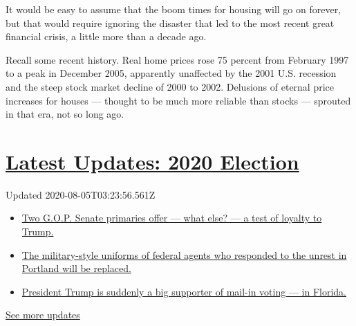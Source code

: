 It would be easy to assume that the boom times for housing will go on
forever, but that would require ignoring the disaster that led to the
most recent great financial crisis, a little more than a decade ago.

Recall some recent history. Real home prices rose 75 percent from
February 1997 to a peak in December 2005, apparently unaffected by the
2001 U.S. recession and the steep stock market decline of 2000 to 2002.
Delusions of eternal price increases for houses --- thought to be much
more reliable than stocks --- sprouted in that era, not so long ago.

\hypertarget{latest-updates-2020-election}{%
\section{\texorpdfstring{\href{https://www.nytimes.com/2020/08/04/us/elections/primary-election-michigan-arizona-kansas.html?action=click\&pgtype=Article\&state=default\&region=MAIN_CONTENT_1\&context=storylines_live_updates}{Latest
Updates: 2020
Election}}{Latest Updates: 2020 Election}}\label{latest-updates-2020-election}}

Updated 2020-08-05T03:23:56.561Z

\begin{itemize}
\tightlist
\item
  \href{https://www.nytimes.com/2020/08/04/us/elections/primary-election-michigan-arizona-kansas.html?action=click\&pgtype=Article\&state=default\&region=MAIN_CONTENT_1\&context=storylines_live_updates\#link-3924dd44}{Two
  G.O.P. Senate primaries offer --- what else? --- a test of loyalty to
  Trump.}
\item
  \href{https://www.nytimes.com/2020/08/04/us/elections/primary-election-michigan-arizona-kansas.html?action=click\&pgtype=Article\&state=default\&region=MAIN_CONTENT_1\&context=storylines_live_updates\#link-62a8e06b}{The
  military-style uniforms of federal agents who responded to the unrest
  in Portland will be replaced.}
\item
  \href{https://www.nytimes.com/2020/08/04/us/elections/primary-election-michigan-arizona-kansas.html?action=click\&pgtype=Article\&state=default\&region=MAIN_CONTENT_1\&context=storylines_live_updates\#link-32b39e33}{President
  Trump is suddenly a big supporter of mail-in voting --- in Florida.}
\end{itemize}

\href{https://www.nytimes.com/2020/08/04/us/elections/primary-election-michigan-arizona-kansas.html?action=click\&pgtype=Article\&state=default\&region=MAIN_CONTENT_1\&context=storylines_live_updates}{See
more updates}

